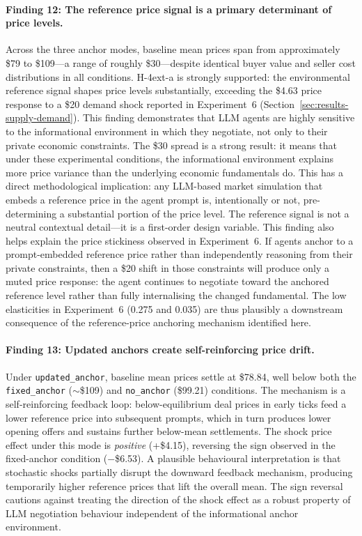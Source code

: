 \paragraph{Finding 12: The reference price signal is a primary determinant of price levels.}
Across the three anchor modes, baseline mean prices span from approximately \$79 to \$109---a range of roughly \$30---despite identical buyer value and seller cost distributions in all conditions.  H-4ext-a is strongly supported: the environmental reference signal shapes price levels substantially, exceeding the \$4.63 price response to a \$20 demand shock reported in Experiment~6 (Section~\ref{sec:results-supply-demand}).  This finding demonstrates that LLM agents are highly sensitive to the informational environment in which they negotiate, not only to their private economic constraints.  The \$30 spread is a strong result: it means that under these experimental conditions, the informational environment explains more price variance than the underlying economic fundamentals do.  This has a direct methodological implication: any LLM-based market simulation that embeds a reference price in the agent prompt is, intentionally or not, pre-determining a substantial portion of the price level.  The reference signal is not a neutral contextual detail---it is a first-order design variable.  This finding also helps explain the price stickiness observed in Experiment~6.  If agents anchor to a prompt-embedded reference price rather than independently reasoning from their private constraints, then a \$20 shift in those constraints will produce only a muted price response: the agent continues to negotiate toward the anchored reference level rather than fully internalising the changed fundamental.  The low elasticities in Experiment~6 (0.275 and 0.035) are thus plausibly a downstream consequence of the reference-price anchoring mechanism identified here.

\paragraph{Finding 13: Updated anchors create self-reinforcing price drift.}
Under \texttt{updated\_anchor}, baseline mean prices settle at \$78.84, well below both the \texttt{fixed\_anchor} ($\sim$\$109) and \texttt{no\_anchor} (\$99.21) conditions.  The mechanism is a self-reinforcing feedback loop: below-equilibrium deal prices in early ticks feed a lower reference price into subsequent prompts, which in turn produces lower opening offers and sustains further below-mean settlements.  The shock price effect under this mode is \emph{positive} (+\$4.15), reversing the sign observed in the fixed-anchor condition ($-$\$6.53).  A plausible behavioural interpretation is that stochastic shocks partially disrupt the downward feedback mechanism, producing temporarily higher reference prices that lift the overall mean.  The sign reversal cautions against treating the direction of the shock effect as a robust property of LLM negotiation behaviour independent of the informational anchor environment.

